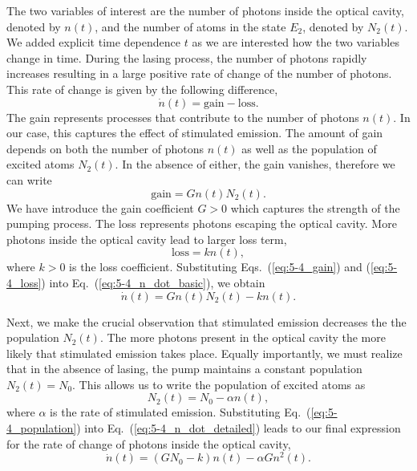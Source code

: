 The two variables of interest are the number of photons inside the optical cavity, denoted by $n(t)$, and the number of atoms in the state $E_2$, denoted by $N_2(t)$.
We added explicit time dependence $t$ as we are interested how the two variables change in time.
During the lasing process, the number of photons rapidly increases resulting in a large positive rate of change of the number of photons.
This rate of change is given by the following difference,
\begin{equation}
    \dot{n}(t) = \text{gain} - \text{loss}.
    \label{eq:5-4_n_dot_basic}
\end{equation}
The gain represents processes that contribute to the number of photons $n(t)$.
In our case, this captures the effect of stimulated emission.
The amount of gain depends on both the number of photons $n(t)$ as well as the population of excited atoms $N_2(t)$.
In the absence of either, the gain vanishes, therefore we can write
\begin{equation}
    \text{gain} = G n (t) N_2(t).
    \label{eq:5-4_gain}
\end{equation}
We have introduce the gain coefficient $G>0$ which captures the strength of the pumping process.
The loss represents photons escaping the optical cavity.
More photons inside the optical cavity lead to larger loss term,
\begin{equation}
    \text{loss} = k n(t),
    \label{eq:5-4_loss}
\end{equation}
where $k>0$ is the loss coefficient.
Substituting Eqs.~(\ref{eq:5-4_gain}) and (\ref{eq:5-4_loss}) into Eq.~(\ref{eq:5-4_n_dot_basic}), we obtain
\begin{equation}
    \dot{n}(t) = G n(t) N_2(t) - k n(t).
    \label{eq:5-4_n_dot_detailed}
\end{equation}

Next, we make the crucial observation that stimulated emission decreases the the population $N_2(t)$.
The more photons present in the optical cavity the more likely that stimulated emission takes place.
Equally importantly, we must realize that in the absence of lasing, the pump maintains a constant population $N_2(t) = N_0$.
This allows us to write the population of excited atoms as
\begin{equation}
    N_2(t) = N_0 - \alpha n(t),
    \label{eq:5-4_population}
\end{equation}
where $\alpha$ is the rate of stimulated emission.
Substituting Eq.~(\ref{eq:5-4_population}) into Eq.~(\ref{eq:5-4_n_dot_detailed}) leads to our final expression for the rate of change of photons inside the optical cavity,
\begin{equation}
    \dot{n}(t) = (G N_0 - k) n(t) - \alpha G n^2(t).
    \label{eq:5-4_n_dot_final}
\end{equation}

